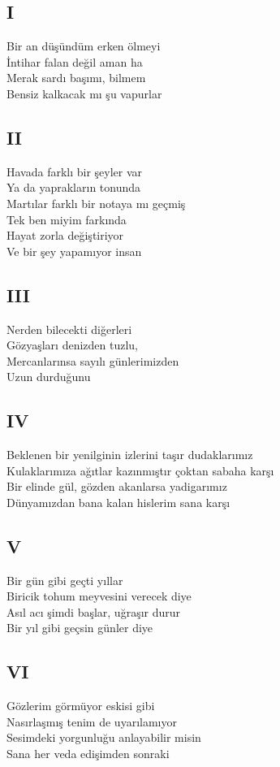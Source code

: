 \subsection{I}
Bir an düşündüm erken ölmeyi \\
İntihar falan değil aman ha \\
Merak sardı başımı, bilmem \\
Bensiz kalkacak mı şu vapurlar

\subsection{II}
Havada farklı bir şeyler var \\
Ya da yaprakların tonunda \\
Martılar farklı bir notaya mı geçmiş \\
Tek ben miyim farkında \\
Hayat zorla değiştiriyor \\
Ve bir şey yapamıyor insan

\subsection{III}
Nerden bilecekti diğerleri \\
Gözyaşları denizden tuzlu, \\
Mercanlarınsa sayılı günlerimizden \\
Uzun durduğunu

\subsection{IV}
Beklenen bir yenilginin izlerini taşır dudaklarımız \\
Kulaklarımıza ağıtlar kazınmıştır çoktan sabaha karşı \\
Bir elinde gül, gözden akanlarsa yadigarımız \\
Dünyamızdan bana kalan hislerim sana karşı

\subsection{V}
Bir gün gibi geçti yıllar \\
Biricik tohum meyvesini verecek diye \\
Asıl acı şimdi başlar, uğraşır durur \\
Bir yıl gibi geçsin günler diye

\subsection{VI}
Gözlerim görmüyor eskisi gibi \\
Nasırlaşmış tenim de uyarılamıyor \\
Sesimdeki yorgunluğu anlayabilir misin \\
Sana her veda edişimden sonraki

